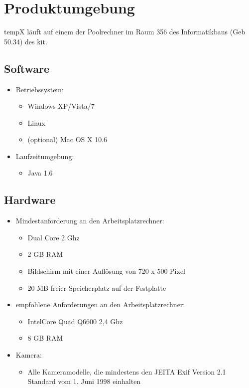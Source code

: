 \section{Produktumgebung}

\gls{tempX} läuft auf einem der Poolrechner im Raum 356 des Informatikbaus (Geb 50.34) des \gls{kit}.

\subsection{Software}

	\begin{itemize}
		
		\item Betriebssystem: 
		\begin{itemize}
			\item Windows XP/Vista/7
			\item Linux
			\item (optional) Mac OS X 10.6
		\end{itemize}
	
		\item Laufzeitumgebung:
		\begin{itemize}
			\item Java 1.6
		\end{itemize}
		
	\end{itemize}
	
\subsection{Hardware}

	\begin{itemize}
		
		\item Mindestanforderung an den Arbeitsplatzrechner: 
		\begin{itemize}
			\item Dual Core 2 Ghz
			\item 2 GB RAM
			\item Bildschirm mit einer Auflösung von 720 x 500 Pixel
			\item 20 MB freier Speicherplatz auf der Festplatte
		\end{itemize}
	
		\item empfohlene Anforderungen an den Arbeitsplatzrechner:
		\begin{itemize}
			\item Intel\textregistered Core Quad Q6600 2,4 Ghz
			\item 8 GB RAM
		\end{itemize}	
	
		\item Kamera:
		\begin{itemize}
			\item Alle Kameramodelle, die mindestens den JEITA Exif Version 2.1 Standard vom 1. Juni 1998 einhalten
		\end{itemize}
		
	\end{itemize}